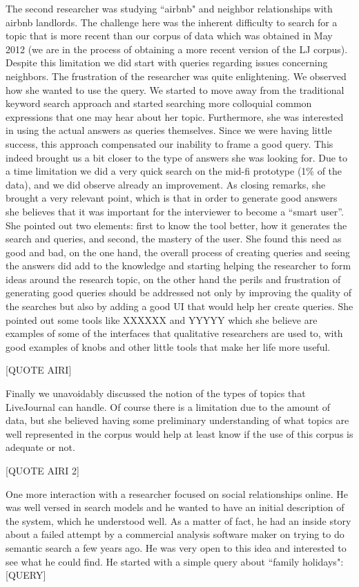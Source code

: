 \documentclass{sigchi}
\begin{document}
The second researcher was studying ``airbnb" and neighbor relationships with airbnb landlords. The challenge here was the inherent difficulty to search for a topic that is more recent than our corpus of data which was obtained in May 2012 (we are in the process of obtaining a more recent version of the LJ corpus). Despite this limitation we did start with queries regarding issues concerning neighbors. The frustration of the researcher was quite enlightening. We observed how she wanted to use the query. We started to move away from the traditional keyword search approach and started searching more colloquial common expressions that one may hear about her topic. Furthermore, she was interested in using the actual answers as queries themselves. Since we were having little success, this approach compensated our inability to frame a good query. This indeed brought us a bit closer to the type of answers she was looking for. Due to a time limitation we did a very quick search on the mid-fi prototype (1\% of the data), and we did observe already an improvement. As closing remarks, she brought a very relevant point, which is that in order to generate good answers she believes that it was important for the interviewer to become a ``smart user''. She pointed out two elements: first to know the tool better, how it generates the search and queries, and second, the mastery of the user. She found this need as good and bad, on the one hand, the overall process of creating queries and seeing the answers did add to the knowledge and starting helping the researcher to form ideas around the research topic, on the other hand the perils and frustration of generating good queries should be addressed not only by improving the quality of the searches but also by adding a good UI that would help her create queries. She pointed out some tools like XXXXXX and YYYYY which she believe are examples of some of the interfaces that qualitative researchers are used to, with good examples of knobs and other little tools that make her life more useful. 


[QUOTE AIRI]

Finally we unavoidably discussed the notion of the types of topics that LiveJournal can handle. Of course there is a limitation due to the amount of data, but she believed having some preliminary understanding of what topics are well represented in the corpus would help at least know if the use of this corpus is adequate or not.

[QUOTE AIRI 2]

One more interaction with a researcher focused on social relationships online. He was well versed in search models and he wanted to have an initial description of the system, which he understood well. As a matter of fact, he had an inside story about a failed attempt by a commercial analysis software maker on trying to do semantic search a few years ago. He was very open to this idea and interested to see what he could find. He started with a simple query about ``family holidays":
[QUERY]
\end{document}
